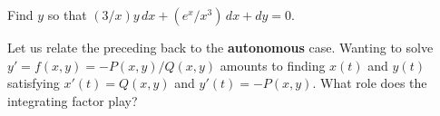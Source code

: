 \documentclass{homework}
\begin{document}
\vfill

\begin{problem}
  Find $y$ so that $(3/x) y \, dx + (e^x / x^3) \, dx + dy = 0$.
\end{problem}

\vfill

\begin{problem}
  Let us relate the preceding back to the \textbf{autonomous} case.  Wanting to solve $y' = f(x,y) = -P(x,y)/Q(x,y)$ amounts to finding $x(t)$ and $y(t)$ satisfying $x'(t) = Q(x,y)$ and $y'(t) = -P(x,y)$.  What role does the integrating factor play?
\end{problem}
\end{document}
